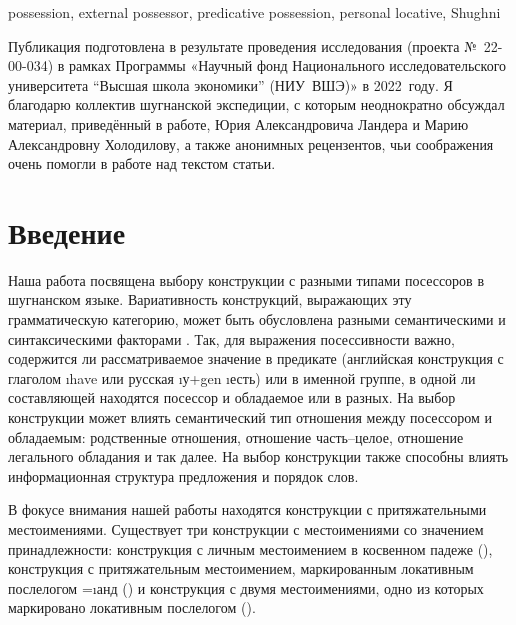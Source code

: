 \begin{eng-keywords}
possession, external possessor, predicative possession, personal locative, Shughni
\end{eng-keywords}

\begin{acknowledgements}
Публикация подготовлена в результате проведения исследования (проекта №~22-00-034) в рамках Программы «Научный фонд Национального исследовательского университета “Высшая школа экономики” (НИУ~ВШЭ)» в 2022~году. Я благодарю коллектив шугнанской экспедиции, с которым неоднократно обсуждал материал, приведённый в работе, Юрия Александровича Ландера и Марию Александровну Холодилову, а также анонимных рецензентов, чьи соображения очень помогли в работе над текстом статьи.
\end{acknowledgements}

\begin{initialprint}
\end{initialprint}

\section{Введение}

Наша работа посвящена выбору конструкции с разными типами посессоров в шугнанском языке. Вариативность конструкций, выражающих эту грамматическую категорию, может быть обусловлена разными семантическими и синтаксическими факторами \parencites{kibrik_etal2006}{aikhenvald2019}{dahl_koptjevskaja_tamm2001}{lander2004}{koenig_haspelmath1997}. Так, для выражения посессивности важно, содержится ли рассматриваемое значение в предикате (английская конструкция с глаголом \i{have} или русская \i{у}+{\sc gen} \i{есть}) или в именной группе, в одной ли составляющей находятся посессор и обладаемое или в разных. На выбор конструкции может влиять семантический тип отношения между посессором и обладаемым: родственные отношения, отношение часть–целое, отношение легального обладания и так далее. На выбор конструкции также способны влиять информационная структура предложения и порядок слов.

В фокусе внимания нашей работы находятся конструкции с притяжательными местоимениями. Существует три конструкции с местоимениями со значением принадлежности: конструкция с личным местоимением в косвенном падеже (), конструкция с притяжательным местоимением, маркированным локативным послелогом =\i{анд} () и конструкция с двумя местоимениями, одно из которых маркировано локативным послелогом ().

